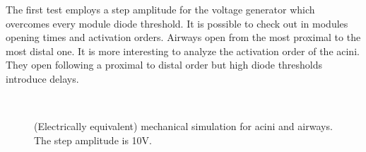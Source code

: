 The first test employs a step amplitude for the voltage generator which
overcomes every module diode threshold.  It is possible to check out in
 modules
opening times and activation orders.  Airways open from the most
proximal to the most distal one.  It is more interesting to analyze
the activation order of the acini.  They open following a proximal
to distal order but high diode thresholds introduce delays.


\begin{figure}[H]\centering
  \hspace{1cm}
  \\
  \hspace{1cm}
  \caption{(Electrically equivalent) mechanical simulation for acini
    and airways.  The step amplitude is 10V.}
  \label{fig:mechanical_results_10_2}
\end{figure}

